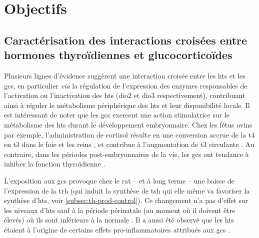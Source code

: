 \documentclass[../main.tex]{subfiles}
\begin{document}




\section{Objectifs}


	\subsection{Caractérisation des interactions croisées entre hormones thyroïdiennes et glucocorticoïdes}
		Plusieurs lignes d'évidence suggèrent une interaction croisée entre les \glspl{ht} et les \glspl{gc}, en particulier \textit{via} la régulation de l'expression des enzymes responsables de l'activation ou l'inactivation des \glspl{ht} (\gls{dio2} et \gls{dio3} respectivement), contribuant ainsi à réguler le métabolisme périphérique des \glspl{ht} et leur disponibilité locale.
		Il est intéressant de noter que les \glspl{gc} exercent une action stimulatrice sur le métabolisme des \glspl{ht} durant le développement embryonnaire.
		Chez les fétus ovins par exemple, l'administration de cortisol résulte en une conversion accrue de la \gls{t4} en \gls{t3} dans le foie et les reins \citep{Wu1978}, et contribue à l'augmentation de \gls{t3} circulante \citep{Darras1996}.
		Au contraire, dans les périodes post-embryonnaires de la vie, les \glspl{gc} ont tendance à inhiber la fonction thyroïdienne \citep{Chopra1975,Decuypere1983,Bianco1987}.
		\par
		L'exposition aux \glspl{gc} provoque chez le rat – et à long terme – une baisse de l'expression de la \gls{trh} (qui induit la synthèse de \gls{tsh} qui elle même va favoriser la synthèse d'\glspl{ht}, voir \autoref{subsec:th-prod-control}).
		Ce changement n'a pas d'effet sur les niveaux d'\glspl{ht} sauf à la période périnatale (au moment où il doivent être élevés) où ils sont inférieurs à la normale \citep{Carbone2012}.
		Il a aussi été observé que les \glspl{ht} étaient à l'origine de certains effets pro-inflammatoires attribués aux \glspl{gc} \citep{Montesinos2012}.
\end{document}
